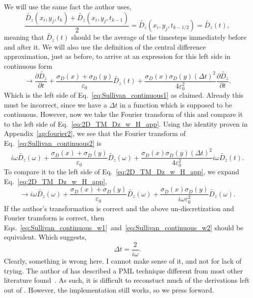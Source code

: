 \documentclass[12pt,twocolumn]{article}
\begin{document}
We will use the same fact the author uses,
\begin{equation}
\frac{\tilde{D_z}(x_i,y_j,t_k)+\tilde{D_z}(x_i,y_j,t_{k-1})}{2} = \tilde{D_z}(x_i,y_j,t_{k-1/2}) = \tilde{D_z}(t),
\end{equation}
meaning that $\tilde{D_z}(t)$ should be the average of the timesteps immediately before and after it. We will also use the definition of the central difference approximation, just as before, to arrive at an expression for this left side in continuous form
\begin{equation}
\label{eq:Sullivan_continuous2}
\rightarrow \frac{\partial\tilde{D_z}}{\partial t} + \frac{\sigma_D(x)+\sigma_D(y)}{\varepsilon_0}\tilde{D_z}(t) +\frac{\sigma_D(x)\sigma_D(y)\left(\Delta t\right)^2}{4\varepsilon_0^2}\frac{\partial \tilde{D_z}}{\partial t}.
\end{equation}
Which is the left side of Eq.~\ref{eq:Sullivan_continuous1} as claimed. Already this must be incorrect, since we have a $\Delta t$ in a function which is supposed to be continuous. However, now we take the Fourier transform of this and compare it to the left side of Eq.~\ref{eq:2D_TM_Dz_w_H_app}. Using the identity proven in Appendix~\ref{ap:fourier2}, we see that the Fourier transform of Eq.~\ref{eq:Sullivan_continuous2} is
\begin{equation}
\label{eq:Sullivan_continuous_w1}
i\omega\tilde{D_z}(\omega)+\frac{\sigma_D(x)+\sigma_D(y)}{\varepsilon_0}\tilde{D_z}(\omega) + \frac{\sigma_D(x)\sigma_D(y)\left(\Delta t\right)^2}{4\varepsilon_0^2}i\omega\tilde{D_z}(t).
\end{equation}
To compare it to the left side of Eq.~\ref{eq:2D_TM_Dz_w_H_app}, we expand Eq.~\ref{eq:2D_TM_Dz_w_H_app},
\begin{equation}
\label{eq:Sullivan_continuous_w2}
\rightarrow i\omega\tilde{D_z}(\omega)+\frac{\sigma_D(x)+\sigma_D(y)}{\varepsilon_0}\tilde{D_z}(\omega)+\frac{\sigma_D(x)\sigma_D(y)}{i\omega\varepsilon_0^2}\tilde{D_z}(\omega).
\end{equation}
If the author's transformation is correct and the above un-discretization and Fourier transform is correct, then Eqs.~\ref{eq:Sullivan_continuous_w1}~and~\ref{eq:Sullivan_continuous_w2} should be equivalent. Which suggests,
\begin{equation}
\Delta t = \frac{2}{i\omega}.
\end{equation}
Clearly, something is wrong here. I cannot make sense of it, and not for lack of trying. The author of \cite{Sullivan00} has described a PML technique different from most other literature found~\cite{Schneider10,Taflove00}. As such, it is difficult to reconstuct much of the derivations left out of \cite{Sullivan00}. However, the implementation still works, so we press forward.
\newpage
\end{document}
